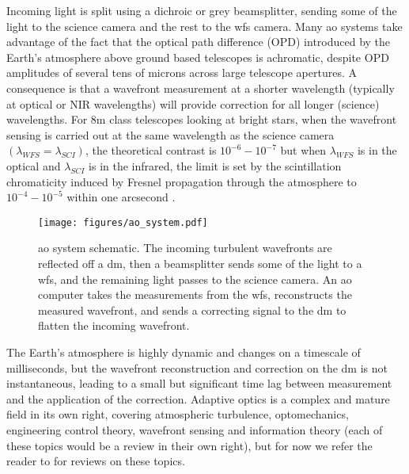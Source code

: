 \documentclass[letterpaper]{ar-1col}
\newcommand{\acc}[1]{\entry{\acs{#1}}{\acl{#1}}}
\begin{document}
\begin{armarginnote}[]
\acc{dm}
\acc{fpm}
\acc{ppm}
\acc{wfs}
\acc{ao}
\end{armarginnote}

Incoming light is split using a dichroic or grey beamsplitter, sending some of the light to the science camera and the rest to the \ac{wfs} camera.
%
Many \ac{ao} systems take advantage of the fact that the optical path difference (OPD) introduced by the Earth's atmosphere above ground based telescopes is achromatic, despite OPD amplitudes of several tens of microns across large telescope apertures.
%
A consequence is that a wavefront measurement at a shorter wavelength (typically at optical or NIR wavelengths) will provide correction for all longer (science) wavelengths.
%
For 8m class telescopes looking at bright stars, when the wavefront sensing is carried out at the same wavelength as the science camera $(\lambda_{WFS}=\lambda_{SCI})$, the theoretical contrast is $10^{-6}-10^{-7}$ but when $\lambda_{WFS}$ is in the optical and $\lambda_{SCI}$ is in the infrared, the limit is set by the scintillation chromaticity induced by Fresnel propagation through the atmosphere to $10^{-4}-10^{-5}$ within one arcsecond \citep[see ][ for a discussion of this and the other limits to \ac{ao} for HCI]{Guyon05-1}.

\begin{figure}[!ht]
\centering
\texttt{[image: figures/ao\_system.pdf]}
 \caption{\ac{ao} system schematic.
 The incoming turbulent wavefronts are reflected off a \ac{dm}, then a beamsplitter sends some of the light to a \ac{wfs}, and the remaining light passes to the science camera.
 An \ac{ao} computer takes the measurements from the \ac{wfs}, reconstructs the measured wavefront, and sends a correcting signal to the \ac{dm} to flatten the incoming wavefront.}
  \label{fig:aosystem}
\end{figure}

The Earth's atmosphere is highly dynamic and changes on a timescale of milliseconds, but the wavefront reconstruction and correction on the \ac{dm} is not instantaneous, leading to a small but significant time lag between measurement and the application of the correction.
%
Adaptive optics is a complex and mature field in its own right, covering atmospheric turbulence, optomechanics, engineering control theory, wavefront sensing and information theory (each of these topics would be a review in their own right), but for now we refer the reader to \citet{Guyon18} for reviews on these topics. 
\end{document}
